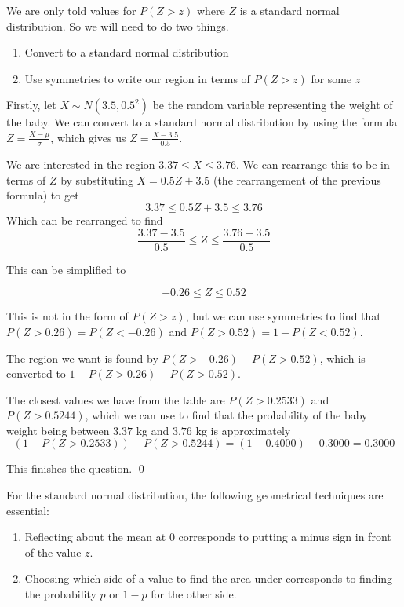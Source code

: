 \begin{solution}
    We are only told values for $P(Z>z)$ where $Z$ is a standard normal distribution. So we will need to do two things.

    \begin{enumerate}
        \item Convert to a standard normal distribution 
        \item Use symmetries to write our region in terms of $P(Z>z)$ for some $z$
    \end{enumerate}

    Firstly, let $X \sim N(3.5, 0.5^2)$ be the random variable representing the weight of the baby. We can convert to a standard normal distribution by using the formula $Z = \frac{X-\mu}{\sigma}$, which gives us 
    $Z = \frac{X-3.5}{0.5}$.

    We are interested in the region $3.37 \leq X \leq 3.76$. We can rearrange this to be in terms of $Z$ by substituting $X = 0.5Z + 3.5$ (the rearrangement of the previous formula) to get
    \[
    3.37 \leq 0.5Z + 3.5 \leq 3.76
    \]
    Which can be rearranged to find 
    \[ \frac{3.37 - 3.5}{0.5} \leq Z \leq \frac{3.76 - 3.5}{0.5} \]

    This can be simplified to

    \[ -0.26 \leq Z \leq 0.52 \]

    This is not in the form of $P(Z>z)$, but we can use symmetries to find that $P(Z>0.26) = P(Z<-0.26)$ and $P(Z>0.52) = 1 - P(Z<0.52)$.

    The region we want is found by $P(Z>-0.26) - P(Z>0.52)$, which is converted to $1 - P(Z>0.26) - P(Z>0.52)$.

    The closest values we have from the table are $P(Z>0.2533)$ and $P(Z>0.5244)$, which we can use to find that the probability of the baby weight being between $3.37$ kg and $3.76$ kg is approximately 
    \[ (1- P(Z>0.2533)) - P(Z>0.5244) = (1-0.4000) - 0.3000 = 0.3000 \]

    This finishes the question.
    \qed
\end{solution}

For the standard normal distribution, the following geometrical techniques are essential:

\begin{enumerate}
    \item Reflecting about the mean at $0$ corresponds to putting a minus sign in front of the value $z$.
    \item Choosing which side of a value to find the area under corresponds to finding the probability $p$ or $1-p$ for the other side.
\end{enumerate}

